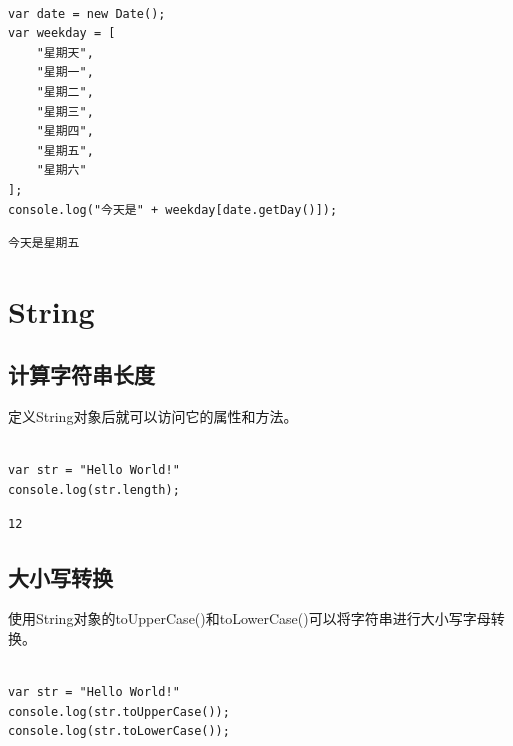 \\

\begin{lstlisting}[style=htmlcssjs]
var date = new Date();
var weekday = [
    "星期天",
    "星期一",
    "星期二",
    "星期三",
    "星期四",
    "星期五",
    "星期六"
];
console.log("今天是" + weekday[date.getDay()]);
\end{lstlisting}

\begin{tcolorbox}
	\begin{verbatim}
今天是星期五
	\end{verbatim}
\end{tcolorbox}

\newpage

\section{String}

\subsection{计算字符串长度}

定义String对象后就可以访问它的属性和方法。\\

\\

\begin{lstlisting}[style=htmlcssjs]
var str = "Hello World!"
console.log(str.length);
\end{lstlisting}

\begin{tcolorbox}
	\begin{verbatim}
12
	\end{verbatim}
\end{tcolorbox}

\vspace{0.5cm}

\subsection{大小写转换}

使用String对象的toUpperCase()和toLowerCase()可以将字符串进行大小写字母转换。\\

\\

\begin{lstlisting}[style=htmlcssjs]
var str = "Hello World!"
console.log(str.toUpperCase());
console.log(str.toLowerCase());
\end{lstlisting}

